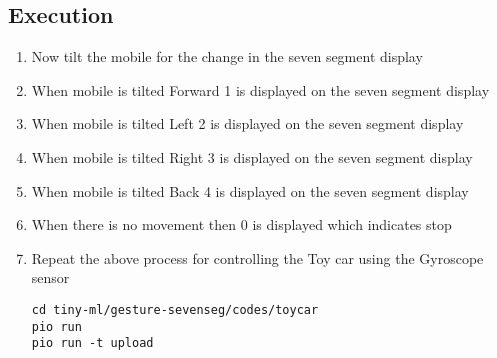 \subsection{Execution}
\begin{enumerate}
    \item Now tilt the mobile for the change in the seven segment display
    \item When mobile is tilted Forward 1 is displayed on the seven segment display
    \item When mobile is tilted Left 2 is displayed on the seven segment display
    \item When mobile is tilted Right 3 is displayed on the seven segment display
    \item When mobile is tilted Back 4 is displayed on the seven segment display
    \item When there is no movement then 0 is displayed which indicates stop
    \item Repeat the above process for controlling the Toy car using the Gyroscope sensor
\begin{lstlisting}
cd tiny-ml/gesture-sevenseg/codes/toycar
pio run
pio run -t upload
\end{lstlisting}
\end{enumerate}
